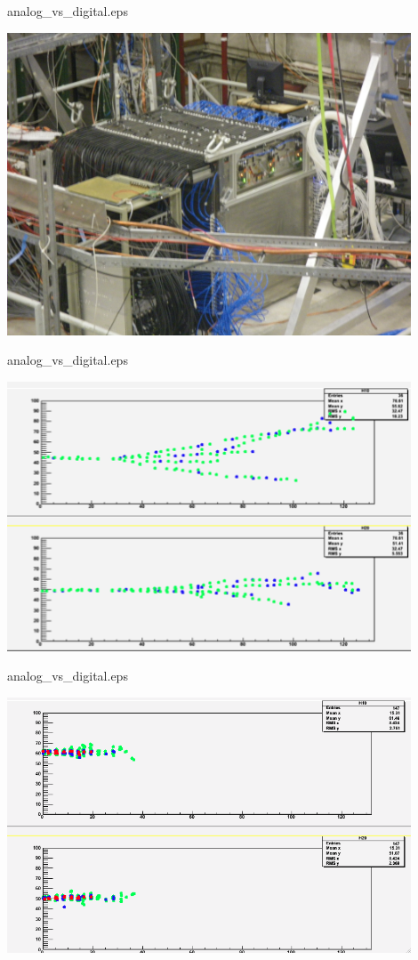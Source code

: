 \documentclass[10pt]{beamer}
\begin{document}
\begin{frame}{analog\_vs\_digital.eps}
    \centerline{\includegraphics[width=0.9\textwidth]{images/1m3Photo}}
\end{frame}
\begin{frame}{analog\_vs\_digital.eps}
    \centerline{\includegraphics[width=0.9\textwidth]{images/10GevPion}}
\end{frame}
\begin{frame}{analog\_vs\_digital.eps}
    \centerline{\includegraphics[width=0.9\textwidth]{images/10GevElectron}}
\end{frame}
\end{document}
